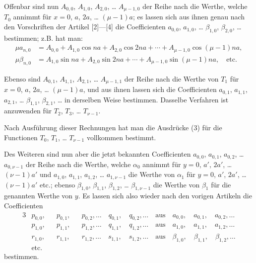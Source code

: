 \documentclass[12pt,a4paper]{article}
\begin{document}
Offenbar sind nun $A_{0,0}$, $A_{1,0}$, $A_{2,0}$, \ldots{} $A_{\mu-1,0}$ der Reihe nach die Werthe, welche $T_0$ annimmt für $x = 0$, $a$, $2a$, \ldots{} $(\mu-1)a$; es lassen sich aus ihnen genau nach den Vorschriften der Artikel [2]---[4] die Coefficienten $a_{0,0}$, $a_{1,0}$, \ldots{} $\beta_{1,0}$, $\beta_{2,0}$, \ldots{} bestimmen; z.B. hat man:
\begin{align*}
\mu a_{n,0} &= A_{0,0} + A_{1,0} \cos na + A_{2,0} \cos 2na + \cdots + A_{\mu-1,0} \cos(\mu-1)na,\\
\mu \beta_{n,0} &= A_{1,0} \sin na + A_{2,0} \sin 2na + \cdots + A_{\mu-1,0} \sin(\mu-1)na, \quad \text{etc.}
\end{align*}

Ebenso sind $A_{0,1}$, $A_{1,1}$, $A_{2,1}$, \ldots{} $A_{\mu-1,1}$ der Reihe nach die Werthe von $T_1$ für $x = 0$, $a$, $2a$, \ldots{} $(\mu-1)a$, und aus ihnen lassen sich die Coefficienten $a_{0,1}$, $a_{1,1}$, $a_{2,1}$, \ldots{} $\beta_{1,1}$, $\beta_{2,1}$, \ldots{} in derselben Weise bestimmen. Dasselbe Verfahren ist anzuwenden für $T_2$, $T_3$, \ldots{} $T_{\nu-1}$.

Nach Ausführung dieser Rechnungen hat man die Ausdrücke (3) für die Functionen $T_0$, $T_1$, \ldots{} $T_{\nu-1}$ vollkommen bestimmt.

Des Weiteren sind nun aber die jetzt bekannten Coefficienten $a_{0,0}$, $a_{0,1}$, $a_{0,2}$, \ldots{} $a_{0,\nu-1}$ der Reihe nach die Werthe, welche $\alpha_0$ annimmt für $y = 0$, $a'$, $2a'$, \ldots{} $(\nu-1)a'$ und $a_{1,0}$, $a_{1,1}$, $a_{1,2}$, \ldots{} $a_{1,\nu-1}$ die Werthe von $\alpha_1$ für $y = 0$, $a'$, $2a'$, \ldots{} $(\nu-1)a'$ etc.; ebenso $\beta_{1,0}$, $\beta_{1,1}$, $\beta_{1,2}$, \ldots{} $\beta_{1,\nu-1}$ die Werthe von $\beta_1$ für die genannten Werthe von $y$. Es lassen sich also wieder nach den vorigen Artikeln die Coefficienten 
\begin{alignat*}{3}
&p_{0,0}, && p_{0,1}, && p_{0,2}, \ldots \quad q_{0,1}, \quad q_{0,2}, \ldots \quad \text{aus} \quad a_{0,0}, \quad a_{0,1}, \quad a_{0,2}, \ldots\\
&p_{1,0}, && p_{1,1}, && p_{1,2}, \ldots \quad q_{1,1}, \quad q_{1,2}, \ldots \quad \text{aus} \quad a_{1,0}, \quad a_{1,1}, \quad a_{1,2}, \ldots\\
&r_{1,0}, && r_{1,1}, && r_{1,2}, \ldots \quad s_{1,1}, \quad s_{1,2}, \ldots \quad \text{aus} \quad \beta_{1,0}, \quad \beta_{1,1}, \quad \beta_{1,2}, \ldots\\
&\text{etc.} && &&
\end{alignat*}
bestimmen.
\end{document}
